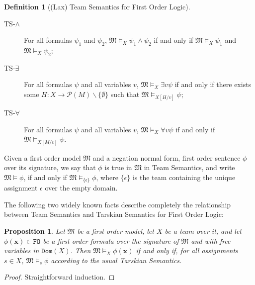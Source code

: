 \documentclass{article}
\newtheorem{Proposition}[Theorem]{Proposition}
\theoremstyle{definition}
\newtheorem{Definition}[Theorem]{Definition}
\newcommand{\tuple}{\mathbf}
\newcommand{\FO}{\texttt{FO}}
\newcommand{\M}{\mathfrak M}
\newcommand{\parts}{\mathcal P}
\newcommand{\dom}{\texttt{Dom}}
\begin{document}
\begin{Definition}[(Lax) Team Semantics for First Order Logic]
\begin{description}
\item[TS-$\wedge$] For all formulas $\psi_1$ and $\psi_2$, $\M \models_X \psi_1 \wedge \psi_2$ if and only if $\M \models_X \psi_1$ and $\M \models_X \psi_2$;
\item[TS-$\exists$] For all formulas $\psi$ and all variables $v$, $\M \models_X \exists v \psi$ if and only if there exists some $H:X \rightarrow \parts(M) \backslash \{\emptyset\}$ such that $\M \models_{X[H/v]} \psi$;
\item[TS-$\forall$] For all formulas $\psi$ and all variables $v$, $\M \models_X \forall v \psi$ if and only if $\M \models_{X[M/v]} \psi$. 
\end{description}
Given a first order model $\M$ and a negation normal form, first order sentence $\phi$ over its signature, we say that $\phi$ is true in $\M$ in Team Semantics, and write $\M \models \phi$, if and only if $\M \models_{\{\epsilon\}} \phi$, where $\{\epsilon\}$ is the team containing the unique assignment $\epsilon$ over the empty domain.
\label{def:teamsem}
\end{Definition}
The following two widely known facts describe completely the relationship between Team Semantics and Tarskian Semantics for First Order Logic: 
\begin{Proposition}
Let $\M$ be a first order model, let $X$ be a team over it, and let $\phi(\tuple x) \in \FO$ be a first order formula over the signature of $\M$ and with free variables in $\dom(X)$. Then $\M \models_X \phi(\tuple x)$ if and only if, for all assignments $s \in X$, $\M \models_s \phi$ according to the usual Tarskian Semantics. 
\label{propo:FOform}
\end{Proposition}
\begin{proof}
Straightforward induction. 
\end{proof}
\end{document}
